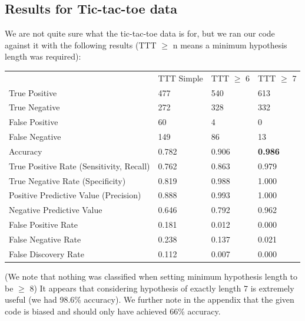 \documentclass[12pt, a4, epsf] {article}
\theoremstyle{plain}
\theoremstyle{definition}
\begin{document}
\subsection*{Results for Tic-tac-toe data}
We are not quite sure what the tic-tac-toe data is for, but we ran our code against it with the following results (TTT $\geq$ n means a minimum hypothesis length was required):\\
\begin{table}[htbp]
\begin{tabular}{llll}
                                         & TTT Simple & TTT $\geq$ 6 & TTT $\geq$ 7 \\
True Positive                            & 477        & 540                  & 613                  \\
True Negative                            & 272        & 328                  & 332                  \\
False Positive                           & 60         & 4                    & 0                    \\
False Negative                           & 149        & 86                   & 13                   \\
Accuracy                                 & 0.782      & 0.906                & \textbf{0.986               } \\
True Positive Rate (Sensitivity, Recall) & 0.762      & 0.863                & 0.979                \\
True Negative Rate (Specificity)         & 0.819      & 0.988                & 1.000                \\
Positive Predictive Value (Precision)    & 0.888      & 0.993                & 1.000                \\
Negative Predictive Value                & 0.646      & 0.792                & 0.962                \\
False Positive Rate                      & 0.181      & 0.012                & 0.000                \\
False Negative Rate                      & 0.238      & 0.137                & 0.021                \\
False Discovery Rate                     & 0.112      & 0.007                & 0.000               
\end{tabular}
\end{table}
\FloatBarrier
(We note that nothing was classified when setting minimum hypothesis length to be $\geq$ 8)
It appears that considering hypothesis of exactly length 7 is extremely useful (we had 98.6\% accuracy). We further note in the appendix that the given code is biased and should only have achieved 66\% accuracy.
\end{document}
